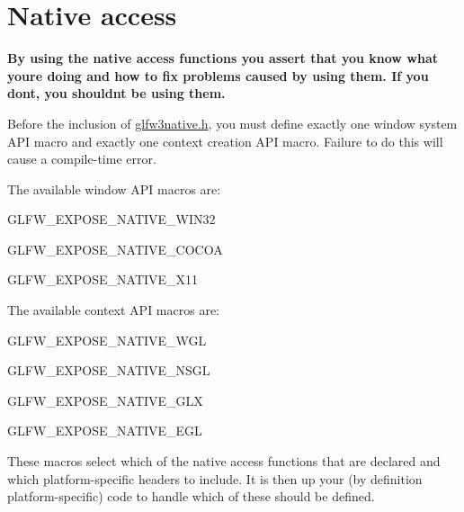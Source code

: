 \hypertarget{group__native}{}\section{Native access}
\label{group__native}
{\bfseries By using the native access functions you assert that you know what you\textquotesingle{}re doing and how to fix problems caused by using them. If you don\textquotesingle{}t, you shouldn\textquotesingle{}t be using them.}

Before the inclusion of \hyperlink{glfw3native_8h_source}{glfw3native.\+h}, you must define exactly one window system A\+P\+I macro and exactly one context creation A\+P\+I macro. Failure to do this will cause a compile-\/time error.

The available window A\+P\+I macros are\+:
\begin{DoxyItemize}
\item {\ttfamily G\+L\+F\+W\+\_\+\+E\+X\+P\+O\+S\+E\+\_\+\+N\+A\+T\+I\+V\+E\+\_\+\+W\+I\+N32}
\item {\ttfamily G\+L\+F\+W\+\_\+\+E\+X\+P\+O\+S\+E\+\_\+\+N\+A\+T\+I\+V\+E\+\_\+\+C\+O\+C\+O\+A}
\item {\ttfamily G\+L\+F\+W\+\_\+\+E\+X\+P\+O\+S\+E\+\_\+\+N\+A\+T\+I\+V\+E\+\_\+\+X11}
\end{DoxyItemize}

The available context A\+P\+I macros are\+:
\begin{DoxyItemize}
\item {\ttfamily G\+L\+F\+W\+\_\+\+E\+X\+P\+O\+S\+E\+\_\+\+N\+A\+T\+I\+V\+E\+\_\+\+W\+G\+L}
\item {\ttfamily G\+L\+F\+W\+\_\+\+E\+X\+P\+O\+S\+E\+\_\+\+N\+A\+T\+I\+V\+E\+\_\+\+N\+S\+G\+L}
\item {\ttfamily G\+L\+F\+W\+\_\+\+E\+X\+P\+O\+S\+E\+\_\+\+N\+A\+T\+I\+V\+E\+\_\+\+G\+L\+X}
\item {\ttfamily G\+L\+F\+W\+\_\+\+E\+X\+P\+O\+S\+E\+\_\+\+N\+A\+T\+I\+V\+E\+\_\+\+E\+G\+L}
\end{DoxyItemize}

These macros select which of the native access functions that are declared and which platform-\/specific headers to include. It is then up your (by definition platform-\/specific) code to handle which of these should be defined. 